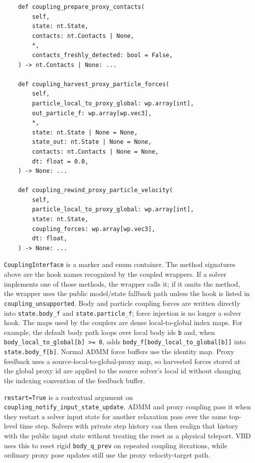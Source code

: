 \documentclass[11pt]{article}
\begin{document}
\begin{verbatim}
    def coupling_prepare_proxy_contacts(
        self,
        state: nt.State,
        contacts: nt.Contacts | None,
        *,
        contacts_freshly_detected: bool = False,
    ) -> nt.Contacts | None: ...

    def coupling_harvest_proxy_particle_forces(
        self,
        particle_local_to_proxy_global: wp.array[int],
        out_particle_f: wp.array[wp.vec3],
        *,
        state: nt.State | None = None,
        state_out: nt.State | None = None,
        contacts: nt.Contacts | None = None,
        dt: float = 0.0,
    ) -> None: ...

    def coupling_rewind_proxy_particle_velocity(
        self,
        particle_local_to_proxy_global: wp.array[int],
        state: nt.State,
        coupling_forces: wp.array[wp.vec3],
        dt: float,
    ) -> None: ...

\end{verbatim}

\texttt{CouplingInterface} is a marker and enum container. The method
signatures above are the hook names recognized by the coupled wrappers. If a
solver implements one of those methods, the wrapper calls it; if it omits the
method, the wrapper uses the public model/state fallback path unless the hook is
listed in \texttt{coupling\_unsupported}. Body and particle coupling forces are
written directly into \texttt{state.body\_f} and \texttt{state.particle\_f};
force injection is no longer a solver hook.  The maps
used by the couplers are dense local-to-global index maps.  For example, the
default body path loops over local body ids \texttt{b} and, when
\texttt{body\_local\_to\_global[b] >= 0}, adds
\texttt{body\_f[body\_local\_to\_global[b]]} into \texttt{state.body\_f[b]}.
Normal ADMM force buffers use the identity map. Proxy feedback uses a
source-local-to-global-proxy map, so harvested forces stored at the global proxy
id are applied to the source solver's local id without changing the indexing
convention of the feedback buffer.

\texttt{restart=True} is a contextual argument on
\texttt{coupling\_notify\_input\_state\_update}.  ADMM and proxy coupling pass it
when they restart a solver input state for another relaxation pass over the same
top-level time step.  Solvers with private step history can then realign that
history with the public input state without treating the reset as a physical
teleport.  VBD uses this to reset rigid \texttt{body\_q\_prev} on repeated
coupling iterations, while ordinary proxy pose updates still use the proxy
velocity-target path.
\end{document}
